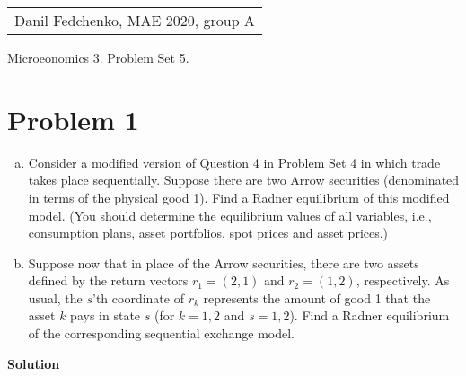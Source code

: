\documentclass[a4paper]{article}
\begin{document}
	\begin{flushright}
	\begin{tabular}{r}
		Danil Fedchenko, MAE 2020, group A \\
	\end{tabular}
\end{flushright}


\begin{center}
	Microeonomics 3. Problem Set 5.
\end{center}
\section*{Problem 1}
\begin{enumerate}[(a)]
	\item  Consider a modified version of Question 4 in Problem Set 4 in which trade takes
	place sequentially. Suppose there are two Arrow securities (denominated in terms of the
	physical good 1). Find a Radner equilibrium of this modified model. (You should determine
	the equilibrium values of all variables, i.e., consumption plans, asset portfolios, spot prices
	and asset prices.)
	\item Suppose now that in place of the Arrow securities, there are two assets defined by the
	return vectors $r_1 = (2, 1)$ and $r_2 = (1, 2)$, respectively. As usual, the $s$’th coordinate of $r_k$
	represents the amount of good 1 that the asset $k$ pays in state $s$ (for $k = 1, 2$ and $s = 1, 2$).
	Find a Radner equilibrium of the corresponding sequential exchange model.

\end{enumerate}


\textbf{Solution}
\end{document}
